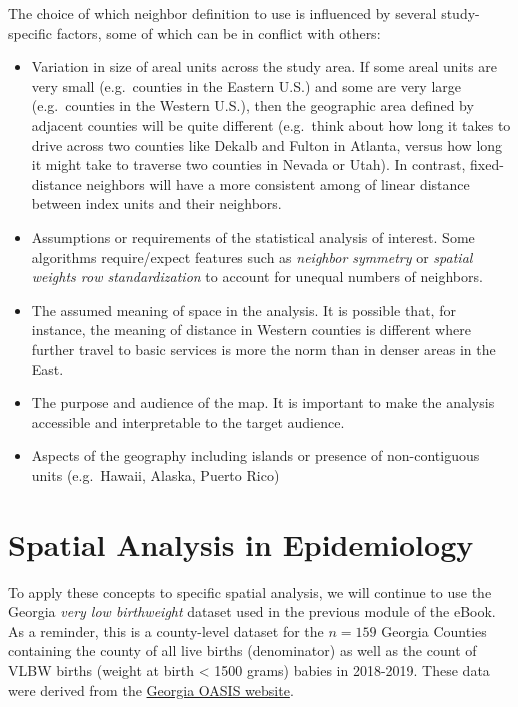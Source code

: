 \documentclass[
]{book}
\providecommand{\tightlist}{%
  \setlength{\itemsep}{0pt}\setlength{\parskip}{0pt}}
\begin{document}
The choice of which neighbor definition to use is influenced by several study-specific factors, some of which can be in conflict with others:

\begin{itemize}
\tightlist
\item
  Variation in size of areal units across the study area. If some areal units are very small (e.g.~counties in the Eastern U.S.) and some are very large (e.g.~counties in the Western U.S.), then the geographic area defined by adjacent counties will be quite different (e.g.~think about how long it takes to drive across two counties like Dekalb and Fulton in Atlanta, versus how long it might take to traverse two counties in Nevada or Utah). In contrast, fixed-distance neighbors will have a more consistent among of linear distance between index units and their neighbors.
\item
  Assumptions or requirements of the statistical analysis of interest. Some algorithms require/expect features such as \emph{neighbor symmetry} or \emph{spatial weights row standardization} to account for unequal numbers of neighbors.
\item
  The assumed meaning of space in the analysis. It is possible that, for instance, the meaning of distance in Western counties is different where further travel to basic services is more the norm than in denser areas in the East.
\item
  The purpose and audience of the map. It is important to make the analysis accessible and interpretable to the target audience.
\item
  Aspects of the geography including islands or presence of non-contiguous units (e.g.~Hawaii, Alaska, Puerto Rico)
\end{itemize}

\hypertarget{spatial-analysis-in-epidemiology-3}{%
\section{Spatial Analysis in Epidemiology}\label{spatial-analysis-in-epidemiology-3}}

To apply these concepts to specific spatial analysis, we will continue to use the Georgia \emph{very low birthweight} dataset used in the previous module of the eBook. As a reminder, this is a county-level dataset for the \(n=159\) Georgia Counties containing the county of all live births (denominator) as well as the count of VLBW births (weight at birth \textless{} 1500 grams) babies in 2018-2019. These data were derived from the \href{https://oasis.state.ga.us/}{Georgia OASIS website}.
\end{document}
